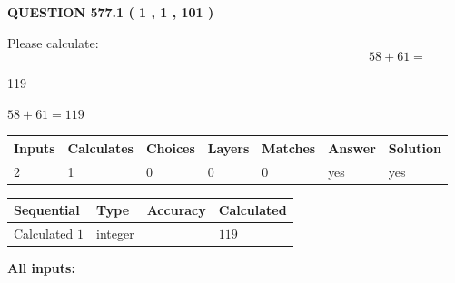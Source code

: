 \documentclass[12pt]{article}
\begin{document}
{\textbf{\Large{QUESTION
577.1 
 ( 1 , 1 , 101 )
}}}
  
  
 
Please calculate:
\begin{equation}
58 +  %
61 = \nonumber
\end{equation}
 
 
 
\noindent{}
 
 

119
 
 
\noindent{}
 
 

 
 
 
\noindent{}
 
 

$ %
58 +  %
61=   %
119$
 
 
\noindent{}
 
 

 
   
   
   
   
\noindent\begin{tabular}{|l|l|l|l|l|l|l|}
 \hline
Inputs & Calculates & Choices & Layers & Matches & Answer & Solution \\ \hline
 2  & 
 1  & 
 0
  & 
 0  & 
 0  & 
  yes & 
  yes 
  \\ \hline
 \end{tabular}
   
   
   
   
\noindent{}
   
   
  
  
\noindent\begin{tabular}{|l|l|l|l|}
\hline
 Sequential & Type & Accuracy & Calculated \\ 
\hline
 
 
  Calculated $  1 $ & integer &  & 
  $ 119 $ 
 \\  \hline  
 \end{tabular}
   
   
   
   
\noindent\vspace{0.1in}\hspace{-0.08in} {\textbf{\Large{All inputs: }}}
   
\end{document}
